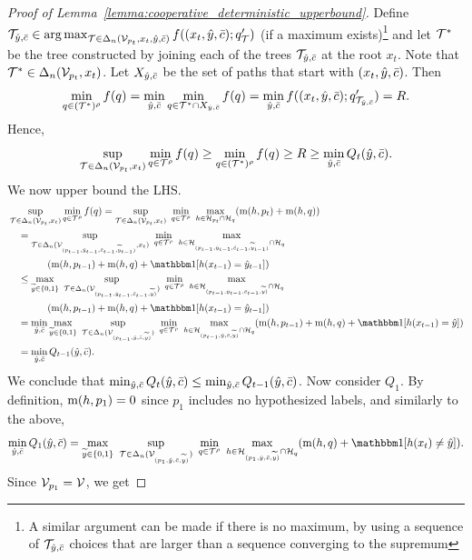 \documentclass[11pt,letterpaper]{article}
\theoremstyle{definition}
\theoremstyle{plain}
\DeclareMathOperator*{\argmax}{arg\,max}
\begin{document}
\begin{proof}[Proof of Lemma~\ref{lemma:cooperative_deterministic_upperbound}]
Define $\T_{\hy,\sc} \in \argmax_{\T \in \Delta_n(\V_{p_t},x_t,\hy,\sc)}f((x_t,\hy,\sc);q'_\T)$ (if a maximum exists)\footnote{A similar argument can be made if there is no maximum, by using a sequence of ${\mathcal T}_{{\hat{y}},\bar{c}}$ choices that are larger than a sequence converging to the supremum}
and let ${\mathcal T}^*$ be the tree constructed by joining each of the trees ${\mathcal T}_{{\hat{y}},\bar{c}}$ at the root $x_t$. Note that ${\mathcal T}^* \in \Delta_n({\mathcal V}_{p_t},x_t)$. Let $X_{{\hat{y}},\bar{c}}$ be the set of paths that start with $(x_t, {\hat{y}},\bar{c})$.
Then
\[
\min_{q \in ({\mathcal T}^*)^\rho} f(q) = \min_{{\hat{y}},\bar{c}} \min_{q \in {\mathcal T}^*\cap X_{{\hat{y}},\bar{c}}} f(q) = \min_{{\hat{y}},\bar{c}}f((x_t,{\hat{y}},\bar{c});q'_{{\mathcal T}_{{\hat{y}},\bar{c}}}) = R.
\]
Hence,
\[
\sup_{{\mathcal T} \in \Delta_n({\mathcal V}_{p_t},x_t)} \min_{q \in {\mathcal T}^\rho} f(q)  \geq \min_{q \in ({\mathcal T}^*)^\rho} f(q) \geq R \geq \min_{{\hat{y}},\bar{c}}Q_t({\hat{y}},\bar{c}).
\]
We now upper bound the LHS.
\begin{align*}
&\sup_{\T \in \Delta_n(\V_{p_t},x_t)} \min_{q \in \T^\rho} f(q) = \sup_{\T\in\Delta_n(\V_{p_t},x_t)} ~\min_{q\in\T^\rho} ~\max_{h\in \H_{p_t}\cap \H_q} (\mi(h, p_{t}) + \mi(h,q))
  \\
  &\quad= \sup_{\T\in\Delta_n(\V_{(p_{t-1},\hy_{t-1}, \sc_{t-1}, \vy_{t-1})},x_t)} ~\min_{q\in\T^\rho} ~\max_{h\in \H_{(p_{t-1},\hy_{t-1}, \sc_{t-1}, \vy_{t-1})}\cap \H_q}
  \\
  &\qquad\qquad (\mi(h, p_{t-1}) + \mi(h,q)+\indct[h(x_{t-1}) = \hy_{t-1}])
  \\
  &\quad\leq \max_{\vy\in\{0,1\}} ~\sup_{\T\in\Delta_n(\V_{(p_{t-1},\hy_{t-1}, \sc_{t-1}, \vy)})} ~\min_{q\in\T^\rho} ~\max_{h\in \H_{(p_{t-1},\hy_{t-1}, \sc_{t-1}, \vy)}\cap \H_q}
  \\
  &\qquad\qquad (\mi(h, p_{t-1}) + \mi(h,q)+\indct[h(x_{t-1}) = \hy_{t-1}])
\\   
  &\quad=\min_{\hy,\sc}\max_{\vy\in\{0,1\}} ~\sup_{\T\in\Delta_n(\V_{(p_{t-1},\hy, \sc, \vy)})} ~\min_{q\in\T^\rho} ~\max_{h\in \H_{(p_{t-1},\hy, \sc, \vy)}\cap \H_q} (\mi(h, p_{t-1}) + \mi(h,q)+\indct[h(x_{t-1}) = \hy]) \\
  &\quad= \min_{\hy,\sc}Q_{t-1}(\hy,\sc).
\end{align*}
We conclude that $\min_{{\hat{y}},\bar{c}}Q_{t}({\hat{y}},\bar{c}) \leq \min_{{\hat{y}},\bar{c}}Q_{t-1}({\hat{y}},\bar{c})$. Now consider $Q_1$. By definition, $\mathrm{m}(h, p_1) = 0$ since $p_1$ includes no hypothesized labels, and 
similarly to the above,
\[
\min_{\hy,\sc}Q_1(\hy, \sc) = \max_{\vy\in\{0,1\}} ~\sup_{\T\in\Delta_n(\V_{(p_1,\hy, \sc, \vy)})} ~\min_{q\in\T^\rho} ~\max_{h\in \H_{(p_1,\hy, \sc, \vy)}\cap \H_q} (\mi(h,q) +\indct[h(x_t) \neq \hy]).
\]
Since ${\mathcal V}_{p_1} = {\mathcal V}$, we get

\end{proof}
\end{document}
